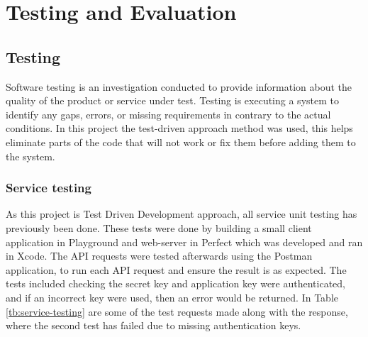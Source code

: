 \chapter{Testing and Evaluation}

\section{Testing}

Software testing is an investigation conducted to provide information about the quality of the product or service under test. Testing is executing a system to identify any gaps, errors, or missing requirements in contrary to the actual conditions. In this project the test-driven approach method was used, this helps eliminate parts of the code that will not work or fix them before adding them to the system.

\subsection{Service testing}

As this project is Test Driven Development approach, all service unit testing has previously been done. These tests were done by building a small client application in Playground and web-server in Perfect which was developed and ran in Xcode. The API requests were tested afterwards using the Postman application, to run each API request and ensure the result is as expected. The tests included checking the secret key and application key were authenticated, and if an incorrect key were used, then an error would be returned.  In Table \ref{tb:service-testing} are some of the test requests made along with the response, where the second test has failed due to missing authentication keys.

